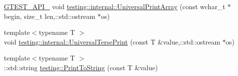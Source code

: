 \begin{DoxyCompactItemize}
\hyperlink{gtest-port_8h_aa73be6f0ba4a7456180a94904ce17790}{G\-T\-E\-S\-T\-\_\-\-A\-P\-I\-\_\-} void \hyperlink{namespacetesting_1_1internal_ae95ea0aea80977c0870df98b27a17cac}{testing\-::internal\-::\-Universal\-Print\-Array} (const wchar\-\_\-t $\ast$begin, size\-\_\-t len,\-::std\-::ostream $\ast$os)
\item 
{\footnotesize template$<$typename T $>$ }\\void \hyperlink{namespacetesting_1_1internal_ab3d834fb6c31d29e36400cc19905294b}{testing\-::internal\-::\-Universal\-Terse\-Print} (const T \&value,\-::std\-::ostream $\ast$os)
\item 
{\footnotesize template$<$typename T $>$ }\\\-::std\-::string \hyperlink{namespacetesting_aa5717bb1144edd1d262d310ba70c82ed}{testing\-::\-Print\-To\-String} (const T \&value)
\end{DoxyCompactItemize}

